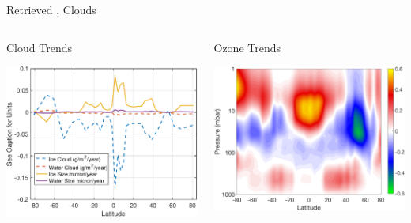 \documentclass[10pt,t]{beamer}
\begin{document}
\begin{frame}[label={sec:orgf65cafd}]{Retrieved \ozone, Clouds}
\vspace{-0.35in}

\begin{columns}
\begin{column}{0.55\columnwidth}
\begin{block}{\footnotesize Cloud Trends}
\vspace{-0.1in}
\begin{center}
\includegraphics[width=0.9\linewidth]{./Figs/Pdf/cloud_trend.pdf}
\end{center}
\end{block}
\end{column}

\begin{column}{0.55\columnwidth}
\begin{block}{\footnotesize Ozone Trends}
\vspace{-0.1in}
\begin{center}
\includegraphics[width=0.9\linewidth]{./Figs/Png/o3_trend_upto_1mbar.png}
\end{center}
\end{block}
\end{column}
\end{columns}



\end{frame}
\end{document}
